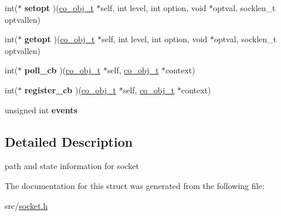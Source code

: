\begin{DoxyCompactItemize}
\item 
\hypertarget{structco__socket__t_a6d3e7ffe7c26430e415af7e53ed9d2b5}{int($\ast$ {\bfseries setopt} )(\hyperlink{structco__obj__t}{co\+\_\+obj\+\_\+t} $\ast$self, int level, int option, void $\ast$optval, socklen\+\_\+t optvallen)}\label{structco__socket__t_a6d3e7ffe7c26430e415af7e53ed9d2b5}

\item 
\hypertarget{structco__socket__t_a8f68b33d5c7223001459499961ccc8d5}{int($\ast$ {\bfseries getopt} )(\hyperlink{structco__obj__t}{co\+\_\+obj\+\_\+t} $\ast$self, int level, int option, void $\ast$optval, socklen\+\_\+t optvallen)}\label{structco__socket__t_a8f68b33d5c7223001459499961ccc8d5}

\item 
\hypertarget{structco__socket__t_a5f6df267292124bcb7633b1d2bcdc7d0}{int($\ast$ {\bfseries poll\+\_\+cb} )(\hyperlink{structco__obj__t}{co\+\_\+obj\+\_\+t} $\ast$self, \hyperlink{structco__obj__t}{co\+\_\+obj\+\_\+t} $\ast$context)}\label{structco__socket__t_a5f6df267292124bcb7633b1d2bcdc7d0}

\item 
\hypertarget{structco__socket__t_afd575e9225c7389a58375a52a720c485}{int($\ast$ {\bfseries register\+\_\+cb} )(\hyperlink{structco__obj__t}{co\+\_\+obj\+\_\+t} $\ast$self, \hyperlink{structco__obj__t}{co\+\_\+obj\+\_\+t} $\ast$context)}\label{structco__socket__t_afd575e9225c7389a58375a52a720c485}

\item 
\hypertarget{structco__socket__t_a7da260ad3df14279a2791818ceca0cac}{unsigned int {\bfseries events}}\label{structco__socket__t_a7da260ad3df14279a2791818ceca0cac}

\end{DoxyCompactItemize}


\subsection{Detailed Description}
path and state information for socket 

The documentation for this struct was generated from the following file\+:\begin{DoxyCompactItemize}
\item 
src/\hyperlink{socket_8h}{socket.\+h}\end{DoxyCompactItemize}
